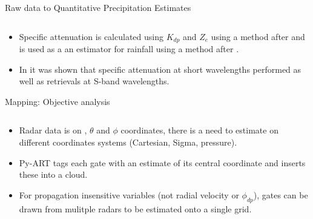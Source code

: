 \documentclass[final]{beamer}
\begin{document}
\begin{frame}{}
\begin{columns}[t]
\begin{column}{.3\linewidth}
\begin{block}{Raw data to Quantitative Precipitation Estimates}
\begin{columns}[t]
\begin{column}{.6\linewidth}
\begin{columns}[t]
\begin{column}{.5\linewidth}
		\end{column}
		\end{columns}
 		\end{column}
	\end{columns}
	\begin{itemize}
	\item Specific attenuation is calculated using {\small $K_{dp}$} and {\small $Z_e$} using a method after \citet{gu_polarimetric_2011} and is used as a an estimator for rainfall 
		using a method after \cite{ryzhkov_potential_2014}.
	\item In \citet{giangrande_precipitation_2014} it was shown that specific attenuation at short wavelengths performed as well as retrievals at S-band wavelengths.
	\end{itemize}
      \end{block}
      
      
       \begin{block}{Mapping: Objective analysis}
       \begin{columns}[t]
		\begin{column}{.5\linewidth}
		\begin{itemize}
		\item Radar data is on , $\theta$ and $\phi$ coordinates, there is a need to estimate on different coordinates systems (Cartesian, Sigma, pressure).
		\item Py-ART tags each gate with an estimate of its central coordinate and inserts these into a cloud. 
		\item For propagation insensitive variables (not radial velocity or $\phi_{dp}$), gates can be drawn from mulitple radars to be estimated onto a single grid. 
		

\end{itemize}
\end{column}
\end{columns}
\end{block}
\end{column}
\end{columns}
\end{frame}
\end{document}
